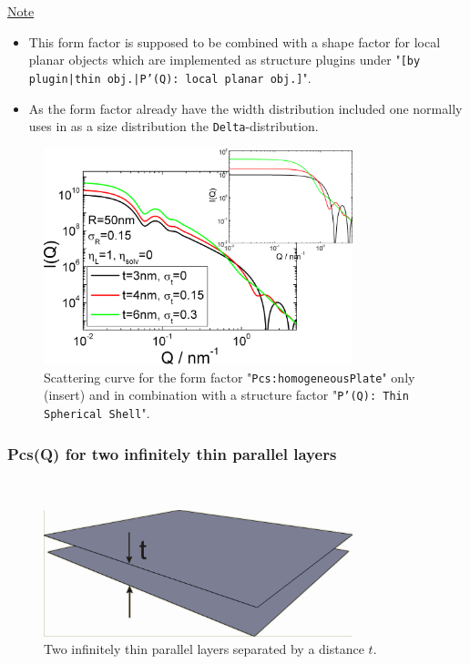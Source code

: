 \noindent
\uline{Note}
\begin{itemize}
  \item This form factor is supposed to be combined with a shape factor for
local planar objects which are implemented as structure  plugins
under "\texttt{[by plugin|thin obj.|P'(Q): local planar
obj.]}".
\item As the form factor already have the width distribution included one normally uses in \SASfit as a size distribution
the \texttt{Delta}-distribution.
\end{itemize}

\begin{figure}[htb]
\begin{center}
\includegraphics[width=0.8\textwidth,height=0.55\textwidth]{../images/form_factor/anisotropic/localplanarIQ.png}
\end{center}
\caption{Scattering curve for the form factor "\texttt{Pcs:homogeneousPlate}" only (insert) and
in combination with a structure factor "\texttt{P'(Q): Thin Spherical Shell}".}
\label{fig_IQ:homogeneousXS}
\end{figure}

\clearpage
\subsubsection{Pcs(Q) for two infinitely thin parallel layers} ~\\
\label{plugin:Pcs:TwoInfinitelyThinLayers}

\begin{figure}[htb]
\begin{center}
\includegraphics[width=0.8\textwidth,height=0.328\textwidth]{../images/form_factor/anisotropic/planar2thin_txt.png}
\end{center}
\caption{Two infinitely thin parallel layers separated by a distance $t$.}
\label{fig:Pcs:TwoInfinitelyThinLayers}
\end{figure}

